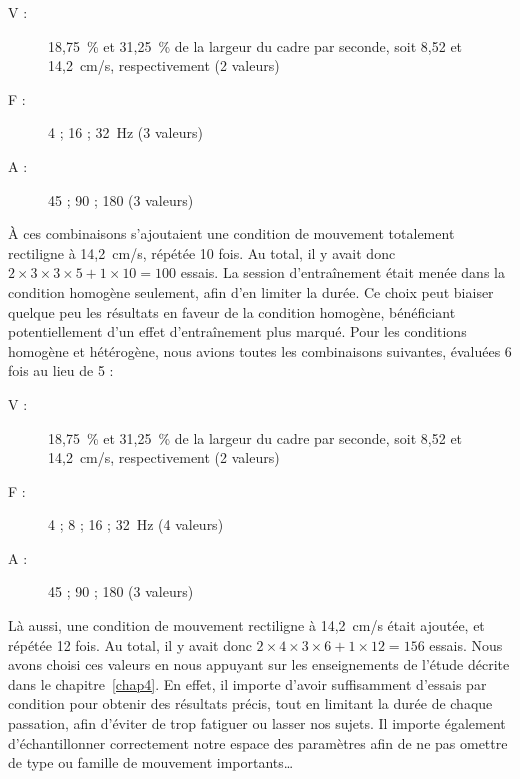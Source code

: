 	\begin{description}
		\item[V :] 18,75~\%{} et 31,25~\%{} de la largeur du cadre par seconde, soit  8,52 et 14,2~cm/s, respectivement (2 valeurs)
		\item[F :] 4 ; 16 ; 32~Hz (3 valeurs)
		\item[A :] 45 ; 90 ; 180\textdegree{} (3 valeurs)
	\end{description}
	
	À ces combinaisons s'ajoutaient une condition de mouvement totalement rectiligne à 14,2~cm/s, répétée 10 fois. Au total, il y avait donc $2\times{}3\times{}3\times{}5+1\times{}10=100$ essais. La session d'entraînement était menée dans la condition homogène seulement, afin d'en limiter la durée. Ce choix peut biaiser quelque peu les résultats en faveur de la condition homogène, bénéficiant potentiellement d'un effet d'entraînement plus marqué. Pour les conditions homogène et hétérogène, nous avions toutes les combinaisons suivantes, évaluées 6 fois au lieu de 5 :
	
	\begin{description}
		\item[V :] 18,75~\%{} et 31,25~\%{} de la largeur du cadre par seconde, soit  8,52 et 14,2~cm/s, respectivement (2 valeurs)
		\item[F :] 4 ; 8 ; 16 ; 32~Hz (4 valeurs)
		\item[A :] 45 ; 90 ; 180\textdegree{} (3 valeurs)
	\end{description}
	
	Là aussi, une condition de mouvement rectiligne à 14,2~cm/s était ajoutée, et répétée 12 fois. Au total, il y avait donc $2\times{}4\times{}3\times{}6+1\times{}12=156$ essais. Nous avons choisi ces valeurs en nous appuyant sur les enseignements de l'étude décrite dans le chapitre~\ref{chap4}. En effet, il importe d'avoir suffisamment d'essais par condition pour obtenir des résultats précis, tout en limitant la durée de chaque passation, afin d'éviter de trop fatiguer ou lasser nos sujets. Il importe également d'échantillonner correctement notre espace des paramètres afin de ne pas omettre de \og type \fg{} ou \og famille \fg{} de mouvement importants\ldots{}
	
